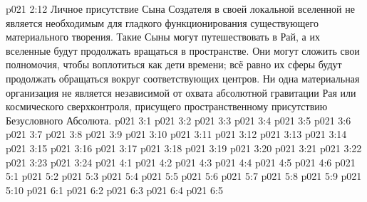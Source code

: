 \vs p021 2:12 Личное присутствие Сына Создателя в своей локальной вселенной не является необходимым для гладкого функционирования существующего материального творения. Такие Сыны могут путешествовать в Рай, а их вселенные будут продолжать вращаться в пространстве. Они могут сложить свои полномочия, чтобы воплотиться как дети времени; всё равно их сферы будут продолжать обращаться вокруг соответствующих центров. Ни одна материальная организация не является независимой от охвата абсолютной гравитации Рая или космического сверхконтроля, присущего пространственному присутствию Безусловного Абсолюта.
\vs p021 3:1 
\vs p021 3:2 \pc 
\vs p021 3:3 
\vs p021 3:4 \pc 
\vs p021 3:5 
\vs p021 3:6 
\vs p021 3:7 
\vs p021 3:8 
\vs p021 3:9 
\vs p021 3:10 
\vs p021 3:11 
\vs p021 3:12 \pc 
\vs p021 3:13 
\vs p021 3:14 
\vs p021 3:15 
\vs p021 3:16 \pc 
\vs p021 3:17 
\vs p021 3:18 
\vs p021 3:19 
\vs p021 3:20 
\vs p021 3:21 
\vs p021 3:22 
\vs p021 3:23 
\vs p021 3:24 \pc 
{}
\vs p021 4:1 
\vs p021 4:2 
\vs p021 4:3 
\vs p021 4:4 
\vs p021 4:5 \pc 
\vs p021 4:6 \pc 
{}
\vs p021 5:1 
\vs p021 5:2 
\vs p021 5:3 
\vs p021 5:4 
\vs p021 5:5 \pc 
\vs p021 5:6 \pc 
\vs p021 5:7 
\vs p021 5:8 \pc 
\vs p021 5:9 
\vs p021 5:10 
\vs p021 6:1 
\vs p021 6:2 
\vs p021 6:3 
\vs p021 6:4 
\vsetoff
\vs p021 6:5 
\quizlink
